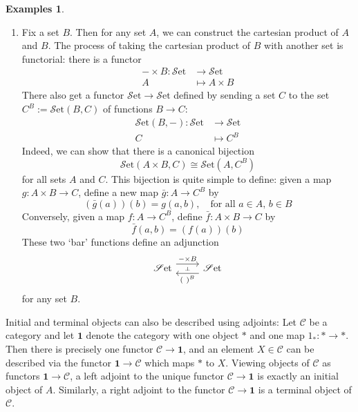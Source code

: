 \documentclass[10pt,oneside]{book}
\def\~#1{\mathscr{#1}}
\newcommand{\Set}{\~S\mathrm{et}}
\theoremstyle{plain}
\theoremstyle{definition}
\newtheorem{exs}[thm]{Examples}
\theoremstyle{remark}
\numberwithin{equation}{section}
\numberwithin{figure}{section}
\begin{document}
\begin{exs}
\begin{enumerate}[label=(\roman*)]
        \item  \label{ex:adjoints6} Fix a set $B$. Then for any set $A$, we can construct the cartesian product of $A$ and $B$. The process of taking the cartesian product of $B$ with another set is functorial: there is a functor
        \begin{align*}
            - \times B : \Set &\to \Set \\
            A &\mapsto A \times B
        \end{align*}
        There also get a functor $\Set \to \Set$ defined by sending a set $C$ to the set $C^B := \Set(B, C)$ of functions $B \to C$:
        \begin{align*}
            \Set(B, -): \Set &\to \Set \\
            C &\mapsto C^B
        \end{align*}
        Indeed, we can show that there is a canonical bijection 
        \[\Set(A \times B, C) \cong \Set(A, C^B)\]
        for all sets $A$ and $C$. This bijection is quite simple to define: given a map $g: A \times B \to C$, define a new map $\bar{g}: A \to C^B$ by
        \[\left(\bar{g}(a)\right)(b) = g(a, b), \quad \text{for all } a \in A, \, b \in B\]
        Conversely, given a map $f: A \to C^B$, define $\bar{f}: A \times B \to C$ by 
        \[\bar{f}(a, b) = \left(f(a)\right)(b)\]
        These two `bar' functions define an adjunction
        \[\begin{tikzcd}
            {\Set} & {\Set}
            \arrow[""{name=0, anchor=center, inner sep=0}, "- \times B", shift left=2, from=1-1, to=1-2]
            \arrow[""{name=1, anchor=center, inner sep=0}, "(~)^B", shift left=2, from=1-2, to=1-1]
            \arrow["\dashv"{anchor=center, rotate=-90}, draw=none, from=0, to=1]
        \end{tikzcd}\]
        for any set $B$.
    \end{enumerate}
\end{exs}

Initial and terminal objects can also be described using adjoints: Let $\~C$ be a category and let $\mathbf{1}$ denote the category with one object $\ast$ and one map $1_\ast: \ast \to \ast$. Then there is precisely one functor $\~C \to \mathbf{1}$, and an element $X \in \~C$ can be described via the functor $\mathbf{1} \to \~C$ which maps $\ast$ to $X$. Viewing objects of $\~C$ as functors $\mathbf{1} \to \~C$, a left adjoint to the unique functor $\~C \to \mathbf{1}$ is exactly an initial object of $A$. Similarly, a right adjoint to the functor $\~C \to \mathbf{1}$ is a terminal object of $\~C$. 
\end{document}
